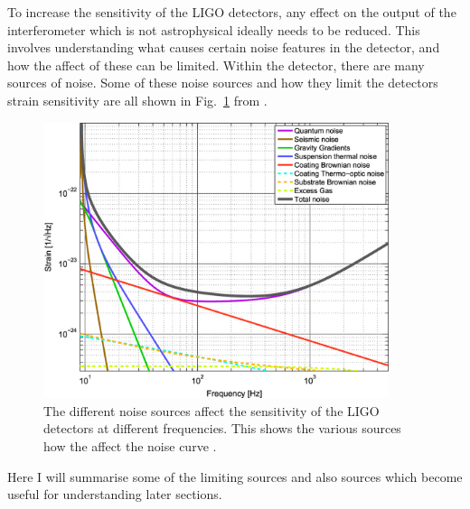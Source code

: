 To increase the sensitivity of the \gls{LIGO} detectors, any effect on the output of the interferometer which is not astrophysical ideally needs to be reduced.
This involves understanding what causes certain noise features in the detector, and how the affect of these can be limited. 
Within the detector, there are many sources of noise.
Some of these noise sources and how they limit the detectors strain sensitivity are all shown in Fig.~\ref{detectors:noisesensitivity} from \citep{aasi2015AdvancedLIGO}.
\begin{figure}[h]
    \centering
    \includegraphics[width=0.9\textwidth]{C1_intro/noise_sensitivity.jpg}
    \caption[Example strain sensitivity curves for different noise sources in \gls{LIGO}.]{The different noise sources affect the sensitivity of the \gls{LIGO} detectors at different frequencies. This shows the various sources how the affect the noise curve \citep{aasi2015AdvancedLIGO}.}
    \label{detectors:noisesensitivity}
\end{figure}
Here I will summarise some of the limiting sources and also sources which become useful for understanding later sections.


